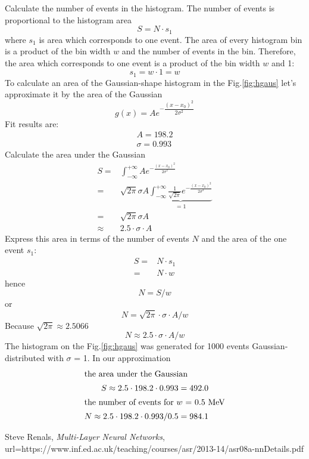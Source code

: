 \documentclass[english, 12pt]{article}
\begin{document}
Calculate the number of events in the histogram. 
The number of events is proportional to the histogram area
$$
S = N \cdot s_1
$$
where $s_1$ is area which corresponds to one event. 
The area of every histogram bin is a product of the bin width $w$ and the number of events in the bin.
Therefore, the area which corresponds to one event is a product of the bin width $w$ and 1: 
$$
s_1 = w \cdot 1 = w
$$
To calculate an area of the Gaussian-shape histogram in the Fig.\ref{fig:hgaus} let's approximate it by the area of the Gaussian
$$
g(x) = Ae^{-\dfrac{(x-x_0)^2}{2\sigma^2}}
$$
Fit results are:
%
\begin{align*}
A = 198.2 \\
\sigma = 0.993
\end{align*}
%
Calculate the area under the Gaussian
%
\begin{align*}
S = & \int_{-\infty}^{+\infty} A e^{-\frac{(x-x_0)^2}{2\sigma^2}} \\
= & \sqrt{2\pi} \sigma A \underbrace{\int_{-\infty}^{+\infty} \frac{1}{\sqrt{2\pi}} e^{-\frac{(x-x_0)^2}{2\sigma^2}}}_{= 1} \\
= & \sqrt{2\pi} \sigma A \\
\approx & 2.5 \cdot \sigma \cdot A
\end{align*}
%
Express this area in terms of the number of events $N$ and the area of the one event $s_1$:
\begin{align*}
S = & N \cdot s_1 \\
= & N \cdot w
\end{align*}
hence
$$
N = S / w 
$$
or
$$
N = \sqrt{2\pi} \cdot \sigma \cdot A / w
$$
Because $\sqrt{2\pi} \approx 2.5066$
$$
N \approx 2.5 \cdot \sigma \cdot A / w
$$
The histogram on the Fig.\ref{fig:hgaus} was generated for 1000 events Gaussian-distributed with $\sigma$ = 1. 
In our approximation
\begin{align*}
\intertext{the area under the Gaussian}
S \approx 2.5 \cdot 198.2 \cdot 0.993 = 492.0 \\
\intertext{the number of events for $w$ = 0.5~MeV}
N \approx 2.5 \cdot 198.2 \cdot 0.993 / 0.5  = 984.1 \\
\end{align*}

\begin{thebibliography}{9}
    
Steve Renals,
\textit{Multi-Layer Neural Networks},
url={https://www.inf.ed.ac.uk/teaching/courses/asr/2013-14/asr08a-nnDetails.pdf}
    
\end{thebibliography}
\end{document}
